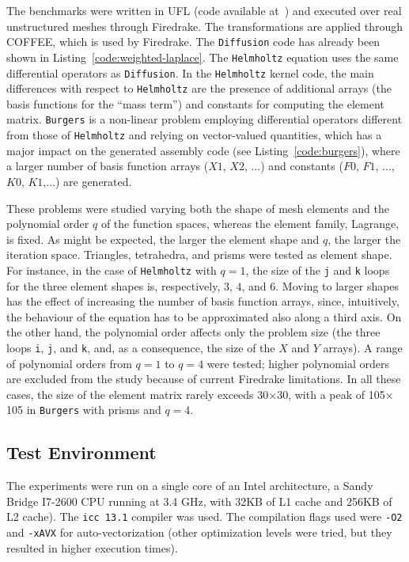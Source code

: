 The benchmarks were written in UFL (code available at~\citep{ufl-code-lowlevelopt}) and executed over real unstructured meshes through Firedrake. The transformations are applied through COFFEE, which is used by Firedrake. The {\tt Diffusion} code has already been shown in Listing~\ref{code:weighted-laplace}. The {\tt Helmholtz} equation uses the same differential operators as {\tt Diffusion}. In the {\tt Helmholtz} kernel code, the main differences with respect to {\tt Helmholtz} are the presence of additional arrays (the basis functions for the ``mass term'') and constants for computing the element matrix. {\tt Burgers} is a non-linear problem employing differential operators different from those of {\tt Helmholtz} and relying on vector-valued quantities, which has a major impact on the generated assembly code (see Listing~\ref{code:burgers}), where a larger number of basis function arrays ($X1$, $X2$, ...) and constants ($F0$, $F1$, ..., $K0$, $K1$,...) are generated.

These problems were studied varying both the shape of mesh elements and the polynomial order $q$ of the function spaces, whereas the element family, Lagrange, is fixed. As might be expected, the larger the element shape and $q$, the larger the iteration space. Triangles, tetrahedra, and prisms were tested as element shape. For instance, in the case of {\tt Helmholtz} with $q=1$, the size of the \texttt{j} and \texttt{k} loops for the three element shapes is, respectively, $3$, $4$, and $6$. Moving to larger shapes has the effect of increasing the number of basis function arrays, since, intuitively, the behaviour of the equation has to be approximated also along a third axis. On the other hand, the polynomial order affects only the problem size (the three loops \texttt{i}, \texttt{j}, and \texttt{k}, and, as a consequence, the size of the $X$ and $Y$ arrays). A range of polynomial orders from $q=1$ to $q=4$ were tested; higher polynomial orders are excluded from the study because of current Firedrake limitations. In all these cases, the size of the element matrix rarely exceeds 30$\times$30, with a peak of 105$\times$105 in {\tt Burgers} with prisms and $q=4$.

\subsection{Test Environment}
The experiments were run on a single core of an Intel architecture, a Sandy Bridge I7-2600 CPU running at 3.4 GHz, with 32KB of L1 cache and 256KB of L2 cache). The \texttt{icc 13.1} compiler was used. The compilation flags used were \texttt{-O2} and \texttt{-xAVX} for auto-vectorization (other optimization levels were tried, but they resulted in higher execution times). 

